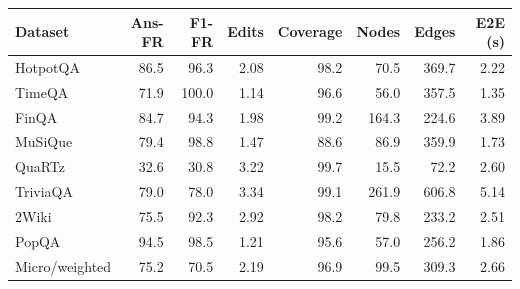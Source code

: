 \begin{tabular}{lrrrrrrr}
\toprule
Dataset & Ans-FR & F1-FR & Edits & Coverage & Nodes & Edges & E2E (s) \\
\midrule
HotpotQA & 86.5 & 96.3 & 2.08 & 98.2 & 70.5 & 369.7 & 2.22 \\
TimeQA & 71.9 & 100.0 & 1.14 & 96.6 & 56.0 & 357.5 & 1.35 \\
FinQA & 84.7 & 94.3 & 1.98 & 99.2 & 164.3 & 224.6 & 3.89 \\
MuSiQue & 79.4 & 98.8 & 1.47 & 88.6 & 86.9 & 359.9 & 1.73 \\
QuaRTz & 32.6 & 30.8 & 3.22 & 99.7 & 15.5 & 72.2 & 2.60 \\
TriviaQA & 79.0 & 78.0 & 3.34 & 99.1 & 261.9 & 606.8 & 5.14 \\
2Wiki & 75.5 & 92.3 & 2.92 & 98.2 & 79.8 & 233.2 & 2.51 \\
PopQA & 94.5 & 98.5 & 1.21 & 95.6 & 57.0 & 256.2 & 1.86 \\
\midrule
Micro/weighted & 75.2 & 70.5 & 2.19 & 96.9 & 99.5 & 309.3 & 2.66 \\
\bottomrule
\end{tabular}
